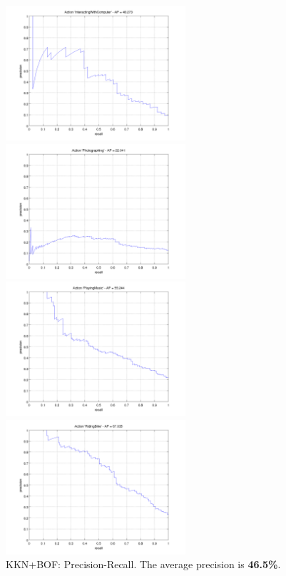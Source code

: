 \documentclass[10pt,a4paper]{llncs}
\begin{document}
\begin{figure}
\caption{KKN+BOF: Precision-Recall. The average precision is \textbf{46.5\%}.}
\label{fig:NN_BOF_PR}
\begin{minipage}{0.5\linewidth}
\includegraphics[height=5cm]{img/KNN_BOF_PR_InteractingWithComputer.png}
\end{minipage}
\begin{minipage}{0.5\linewidth}
\includegraphics[height=5cm]{img/KNN_BOF_PR_Photographing.png}
\end{minipage}
\begin{minipage}{0.5\linewidth}
\includegraphics[height=5cm]{img/KNN_BOF_PR_PlayingMusic.png}
\end{minipage}
\begin{minipage}{0.5\linewidth}
\includegraphics[height=5cm]{img/KNN_BOF_PR_RidingBike.png}

\end{minipage}
\end{figure}
\end{document}
